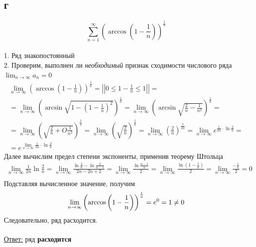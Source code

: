 \documentclass[a5paper, 10pt]{article}
\theoremstyle{definition}
\theoremstyle{plain}
\theoremstyle{remark}
\begin{document}
\subsection{г}
\begin{equation}
\sum \limits_{n = 1}^{\infty} \left(\arccos \left(1-\frac{1}{n} \right) \right)^\frac{1}{n}
\end{equation}
\\
1. Ряд знакопостоянный\\
2. Проверим, выполнен ли \textit{необходимый} признак сходимости числового ряда $ \lim_{n \to \infty} a_n = 0$
\begin{multline*}
 \lim_{n \to \infty} \left(\arccos \left(1-\frac{1}{n} \right) \right)^\frac{1}{n} = \left| \left| 0 \leq1-\frac{1}{n} \leq 1 \right| \right| =\\
= \lim_{n \to \infty}  \left(\arcsin \sqrt{1 - \left(1-\frac{1}{n} \right)^2} \right)^\frac{1}{n}=  \lim_{n \to \infty}  \left(\arcsin \sqrt{\frac{2}{n} -  \frac{1}{n^2}} \right)^\frac{1}{n} =\\ =  \lim_{n \to \infty}  \left(\sqrt{\frac{2}{n} + O\frac{1}{n^2}} \right)^\frac{1}{n} = \lim_{n \to \infty} \left(\sqrt{\frac{2}{n}} \right)^\frac{1}{n}= \lim_{n \to \infty} \left(\frac{2}{n} \right)^\frac{1}{2n}= \lim_{n \to \infty} e^{\frac{1}{2n} \cdot \ln \frac{2}{n}} = \\ =  e^{ \lim_{n \to \infty}\frac{1}{2n} \cdot \ln \frac{2}{n}}
\end{multline*}
Далее вычислим предел степени экспоненты, применив теорему Штольца
\begin{multline*}
\lim_{n \to \infty}\frac{1}{2n} \ln \frac{2}{n} =  \lim_{n \to \infty}\frac{ \ln \frac{2}{n} -  \ln \frac{2}{n - 1}}{2n - 2n + 2} = \lim_{n \to \infty}\frac{ \ln \frac{n -1}{n}}{2} =  \lim_{n \to \infty}\frac{ \ln \left( 1 - \frac{1}{n}\right)}{2} =  \lim_{n \to \infty}\frac{- \frac{1}{n}}{2} = 0\\
\end{multline*}
Подставляя вычисленное значение, получим
\begin{equation}
 \lim_{n \to \infty} \left(\arccos \left(1-\frac{1}{n} \right) \right)^\frac{1}{n} = e^0 = 1 \neq 0 \\
\end{equation}
Следовательно, ряд расходится.\\\\
\underline{Ответ:} ряд  \textbf{расходится}


\newpage
\end{document}

